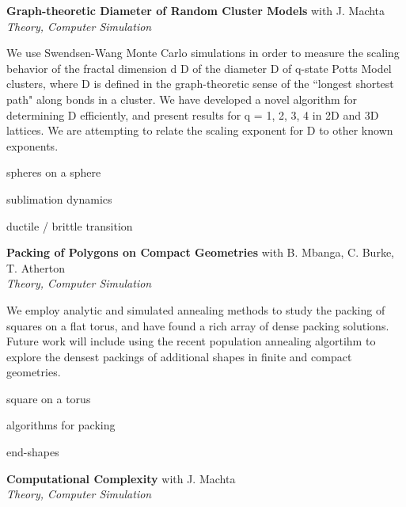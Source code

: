 \documentclass[10pt]{article}
\newcommand{\blankline}{\quad\pagebreak[3]}
\newcommand{\halfblankline}{\quad\vspace{-0.5\baselineskip}\pagebreak[3]}
\begin{document}
\blankline

\textbf{Graph-theoretic Diameter of Random Cluster Models} \hfill {with J. Machta} \\
\emph{Theory, Computer Simulation} 

\halfblankline

We use Swendsen-Wang Monte Carlo simulations in order to measure the scaling behavior of the fractal
dimension d D of the diameter D of q-state Potts Model clusters, where D is defined in the graph-theoretic
sense of the ``longest shortest path" along bonds in a cluster. We have developed a novel algorithm for
determining D efficiently, and present results for q = 1, 2, 3, 4 in 2D and 3D lattices. We are attempting to
relate the scaling exponent for D to other known exponents.
    \begin{innerlist}
        \item spheres on a sphere
        \item sublimation dynamics
        \item ductile / brittle transition

\end{innerlist}

\blankline

\textbf{Packing of Polygons on Compact Geometries} \hfill {with B. Mbanga, C. Burke, T. Atherton} \\
\emph{Theory, Computer Simulation} 

\halfblankline

We employ analytic and simulated annealing methods to study the packing of squares on a flat torus, and
have found a rich array of dense packing solutions. Future work will include using the recent population
annealing algortihm to explore the densest packings of additional shapes in finite and compact geometries.
    \begin{innerlist}
        \item square on a torus
        \item algorithms for packing
        \item end-shapes

\end{innerlist}

\blankline

\textbf{Computational Complexity} \hfill {with J. Machta} \\
\emph{Theory, Computer Simulation} 

\halfblankline
\end{document}

